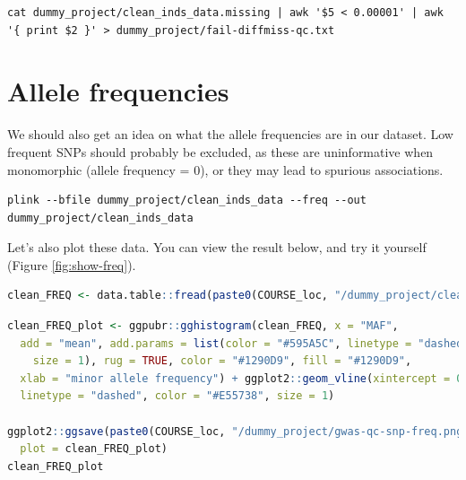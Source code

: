 \documentclass[
]{book}
\begin{document}
\begin{lstlisting}
cat dummy_project/clean_inds_data.missing | awk '$5 < 0.00001' | awk '{ print $2 }' > dummy_project/fail-diffmiss-qc.txt
\end{lstlisting}

\hypertarget{allele-frequencies}{%
\section{Allele frequencies}\label{allele-frequencies}}

We should also get an idea on what the allele frequencies are in our dataset. Low frequent SNPs should probably be excluded, as these are uninformative when monomorphic (allele frequency = 0), or they may lead to spurious associations.

\begin{lstlisting}
plink --bfile dummy_project/clean_inds_data --freq --out dummy_project/clean_inds_data
\end{lstlisting}

Let's also plot these data. You can view the result below, and try it yourself (Figure \ref{fig:show-freq}).

\begin{lstlisting}[language=R]
clean_FREQ <- data.table::fread(paste0(COURSE_loc, "/dummy_project/clean_inds_data.frq"))
\end{lstlisting}

\begin{lstlisting}[language=R]
clean_FREQ_plot <- ggpubr::gghistogram(clean_FREQ, x = "MAF",
  add = "mean", add.params = list(color = "#595A5C", linetype = "dashed",
    size = 1), rug = TRUE, color = "#1290D9", fill = "#1290D9",
  xlab = "minor allele frequency") + ggplot2::geom_vline(xintercept = 0.05,
  linetype = "dashed", color = "#E55738", size = 1)

ggplot2::ggsave(paste0(COURSE_loc, "/dummy_project/gwas-qc-snp-freq.png"),
  plot = clean_FREQ_plot)
clean_FREQ_plot
\end{lstlisting}
\end{document}
